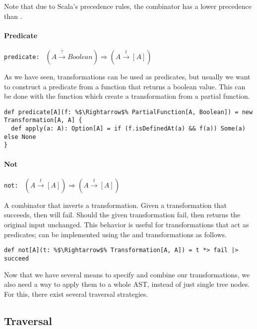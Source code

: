 \documentclass[10pt,a4paper,oneside]{scrreprt}
\begin{document}
Note that due to Scala's precedence rules, the \src{|>} combinator has a lower precedence than \src{*>}.

\paragraph{Predicate} \hfill \lstinline{predicate: } $(A \overset{?}{\rightarrow} Boolean) \Rightarrow (A \overset{t}{\rightarrow} [A])$

\vspace{7pt} As we have seen, transformations can be used as predicates, but usually we want to construct a predicate from a function that returns a boolean value. This can be done with the  function which create a transformation from a partial function.

\begin{lstlisting}
def predicate[A](f: %$\Rightarrow$% PartialFunction[A, Boolean]) = new Transformation[A, A] {
  def apply(a: A): Option[A] = if (f.isDefinedAt(a) && f(a)) Some(a) else None
}
\end{lstlisting}

\paragraph{Not} \hfill \lstinline{not: } $(A \overset{t}{\rightarrow} [A]) \Rightarrow (A \overset{t}{\rightarrow} [A])$

\vspace{7pt} A combinator that inverts a transformation. Given a transformation that succeeds, then  will fail. Should the given transformation fail, then  returns the original input unchanged. This behavior is useful for transformations that act as predicates;  can be implemented using the  and  transformations as follows.

\begin{lstlisting}
def not[A](t: %$\Rightarrow$% Transformation[A, A]) = t *> fail |> succeed
\end{lstlisting}

Now that we have several means to specify and combine our transformations, we also need a way to apply them to a whole AST, instead of just single tree nodes. For this, there exist several traversal strategies.

\subsection{Traversal}
\end{document}
